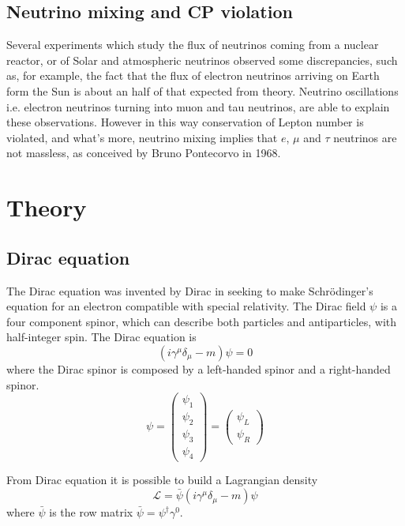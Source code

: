 \documentclass{subnucbo}
\begin{document}
\subsection{Neutrino mixing and CP violation}
Several experiments which study the flux of neutrinos coming from a nuclear reactor, or of Solar and atmospheric neutrinos observed some discrepancies, such as,  for example, the fact that the flux of electron neutrinos arriving on Earth form the Sun is about an half of that expected from theory.
Neutrino oscillations i.e. electron neutrinos turning into muon and tau neutrinos, are able to explain these observations. However in this way conservation of Lepton number is violated, and what's more, neutrino mixing implies that $e$, $\mu$ and $\tau$ neutrinos are not massless, as conceived by Bruno Pontecorvo in 1968. %

\section{Theory}

\subsection{Dirac equation}
The Dirac equation was invented by Dirac in seeking to make Schrödinger's equation for an electron compatible with special relativity. The Dirac field $\psi$ is a four component spinor, which can describe both particles and antiparticles, with half-integer spin.
The Dirac equation is
\begin{equation}
\label{eq:dir}
(i\gamma^{\mu}\delta_{\mu}-m)\psi=0
\end{equation}
where the Dirac spinor is composed by a left-handed spinor and a right-handed spinor.
\begin{equation} 
\psi=\begin{pmatrix}\psi_1\\ \psi_2 \\ \psi_3 \\ \psi_4 \end{pmatrix}=\begin{pmatrix}\psi_L\\ \psi_R \end{pmatrix}
\end{equation}

From Dirac equation it is possible to build a Lagrangian density
\begin{equation}
\label{eq:DirLag}
\mathcal{L}=\bar{\psi}(i\gamma^{\mu}\delta_{\mu}-m)\psi
\end{equation}
where $\bar{\psi}$ is the row matrix $\bar{\psi}=\psi^{\dagger}\gamma^0$.
\end{document}
